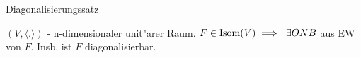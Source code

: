 \documentclass[class=article, crop=false]{standalone}
\begin{document}
\begin{zettel}{Diagonalisierungssatz}
\begin{flashcard}[]{}
	\begin{theorem}[Diagonalisierungssatz]
		$(V, \langle .\rangle) $ - n-dimensionaler unit"arer Raum. $F \in  \Isome(V) \implies \exists ONB$ aus EW von $F$. Insb. ist $F$ diagonalisierbar.
	\end{theorem}
\end{flashcard}
\end{zettel}
\end{document}
